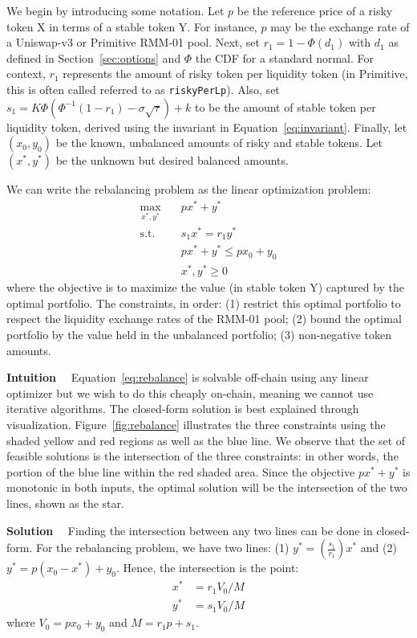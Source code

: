 \documentclass[hidelinks, 12pt]{article}
\begin{document}
We begin by introducing some notation. Let $p$ be the reference price of a risky token X in terms of a stable token Y. For instance, $p$ may be the exchange rate of a Uniswap-v3 or Primitive RMM-01 pool. Next, set $r_1 = 1 - \Phi(d_1)$ with $d_1$ as defined in Section~\ref{sec:options} and $\Phi$ the CDF for a standard normal. For context, $r_1$ represents the amount of risky token per liquidity token (in Primitive, this is often called referred to as \texttt{riskyPerLp}). Also, set $s_1 = K\Phi(\Phi^{-1}(1-r_1)-\sigma\sqrt{\tau}) + k$ to be the amount of stable token per liquidity token, derived using the invariant in Equation~\ref{eq:invariant}. Finally, let $(x_0, y_0)$ be the known, unbalanced  amounts of risky and stable tokens. Let $(x^*, y^*)$ be the unknown but desired balanced amounts.

We can write the rebalancing problem as the linear optimization problem:
\begin{equation}
    \begin{aligned}
        \max_{x^*, y^*}  \quad & p x^* + y^* \\
        \textrm{s.t.} \quad & s_1 x^* = r_1 y^* \\
        &  p x^* + y^* \leq p x_0 + y_0 \\
        & x^*, y^* \geq 0
    \end{aligned}
    \label{eq:rebalance}
\end{equation}
where the objective is to maximize the value (in stable token Y) captured by the optimal portfolio. The constraints, in order: (1) restrict this optimal portfolio to respect the liquidity exchange rates of the RMM-01 pool; (2) bound the optimal portfolio by the value held in the unbalanced portfolio; (3) non-negative token amounts.

\textbf{Intuition}$\quad$ Equation~\ref{eq:rebalance} is solvable off-chain using any linear optimizer but we wish to do this cheaply on-chain, meaning we cannot use iterative algorithms. The closed-form solution is best explained through visualization. Figure~\ref{fig:rebalance} illustrates the three constraints using the shaded yellow and red regions as well as the blue line. We observe that the set of feasible solutions is the intersection of the three constraints: in other words, the portion of the blue line within the red shaded area. Since the objective $p x^* + y^*$ is monotonic in both inputs, the optimal solution will be the intersection of the two lines, shown as the star.

\textbf{Solution}$\quad$ Finding the intersection between any two lines can be done in closed-form. For the rebalancing problem, we have two lines: (1) $y^* = \left(\frac{s_1}{r_1}\right)x^*$ and (2) $y^* = p(x_0 - x^*) + y_0$. Hence, the intersection is the point:
\begin{align}
    x^* &= r_1 V_0 / M \label{eq:rebalance:solution} \\
    y^* &= s_1 V_0 / M \nonumber
\end{align}
where $V_0 = px_0 + y_0$ and $M = r_1 p + s_1$.
\end{document}
